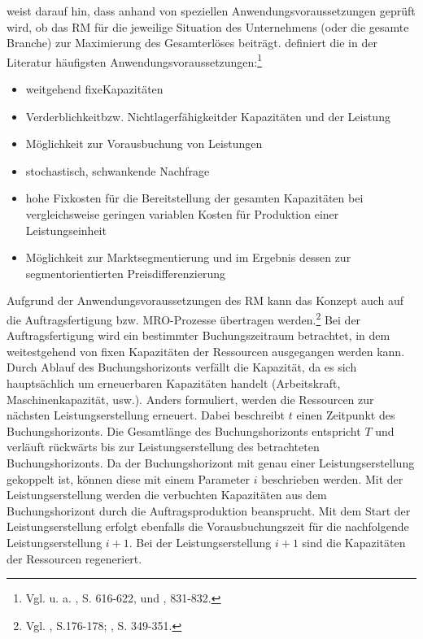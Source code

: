 \cite{Petrick:2009aa} weist da\-rauf hin, dass anhand von speziellen Anwendungsvoraussetzungen geprüft wird, ob das RM für die jeweilige Situation des Unternehmens (oder die gesamte Branche) zur Maximierung des Gesamterlöses beiträgt. \cite{kimes1989yield} definiert die in der Literatur häufigsten Anwendungsvoraussetzungen:\footnote{Vgl. u. a. \cite{friege1996yield}, S. 616-622, und \cite{weatherford1992taxonomy}, 831-832.}
\begin{itemize}
	\item \glqq weitgehend fixe\grqq\;Kapazitäten
	\item \glqq Verderblichkeit\grqq\;bzw. \glqq Nichtlagerfähigkeit\grqq\;der Kapazitäten und der Leistung
	\item Möglichkeit zur Vorausbuchung von Leistungen
	\item stochastisch, schwankende Nachfrage
	\item hohe Fixkosten für die Bereitstellung der gesamten Kapazitäten bei vergleichsweise geringen variablen Kosten für Produktion einer Leistungseinheit
	\item Möglichkeit zur Marktsegmentierung und im Ergebnis dessen zur segmentorientierten Preisdifferenzierung
\end{itemize}
\vspace{0.2cm}
Aufgrund der Anwendungsvoraussetzungen des RM kann das Konzept auch auf die Auftragsfertigung bzw. MRO-Prozesse übertragen werden.\footnote{Vgl. \cite{hintsches2010revenue}, S.176-178; \cite{kimes1989yield}, S. 349-351.} Bei der Auftragsfertigung wird ein bestimmter Buchungszeitraum betrachtet, in dem weitestgehend von fixen Kapazitäten der Ressourcen ausgegangen werden kann. Durch Ablauf des Buchungshorizonts verfällt die Kapazität, da es sich hauptsächlich um erneuerbaren Kapazitäten handelt (Arbeitskraft, Maschinenkapazität, usw.). Anders formuliert, werden die Ressourcen zur nächsten Leistungserstellung erneuert. Dabei beschreibt $t$ einen Zeitpunkt des Buchungshorizonts. Die Gesamtlänge des Buchungshorizonts entspricht $T$ und verläuft rückwärts bis zur Leistungserstellung des betrachteten Buchungshorizonts. Da der Buchungshorizont mit genau einer Leistungserstellung gekoppelt ist, können diese mit einem Parameter $i$ beschrieben werden. Mit der Leistungserstellung werden die verbuchten Kapazitäten aus dem Buchungshorizont durch die Auftragsproduktion beansprucht. Mit dem Start der Leistungserstellung erfolgt ebenfalls die Vorausbuchungszeit für die nachfolgende Leistungserstellung $i+1$. Bei der Leistungserstellung $i+1$ sind die Kapazitäten der Ressourcen regeneriert.


